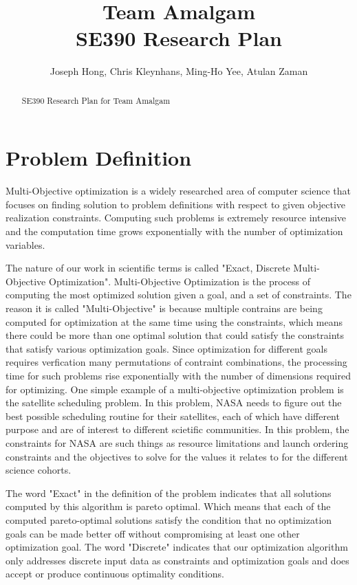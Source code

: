 \documentclass[11pt]{article}
\title{Team Amalgam \\ SE390 Research Plan}
\author{Joseph Hong, Chris Kleynhans, Ming-Ho Yee, Atulan Zaman}
\begin{document}
\maketitle

\begin{abstract}

SE390 Research Plan for Team Amalgam

\end{abstract}

\tableofcontents
\newpage

\section{Problem Definition}
Multi-Objective optimization is a widely researched area of computer science that focuses on finding solution to problem definitions with respect to given objective realization constraints. Computing such problems is extremely resource intensive and the computation time grows exponentially with the number of optimization variables.

The nature of our work in scientific terms is called "Exact, Discrete Multi-Objective Optimization". Multi-Objective Optimization is the process of computing the most optimized solution given a goal, and a set of constraints. The reason it is called "Multi-Objective" is because multiple contrains are being computed for optimization at the same time using the constraints, which means there could be more than one optimal solution that could satisfy the constraints that satisfy various optimization goals. Since optimization for different goals requires verfication many permutations of contraint combinations, the processing time for such problems rise exponentially with the number of dimensions required for optimizing. One simple example of a multi-objective optimization problem is the satellite scheduling problem. In this problem, NASA needs to figure out the best possible scheduling routine for their satellites, each of which have different purpose and are of interest to different scietific communities. In this problem, the constraints for NASA are such things as resource limitations and launch ordering constraints and the objectives to solve for the values it relates to for the different science cohorts.

The word "Exact" in the definition of the problem indicates that all solutions computed by this algorithm is pareto optimal. Which means that each of the computed pareto-optimal solutions satisfy the condition that no optimization goals can be made better off without compromising at least one other optimization goal. The word "Discrete" indicates that our optimization algorithm only addresses discrete input data as constraints and optimization goals and does accept or produce continuous optimality conditions.
\end{document}
